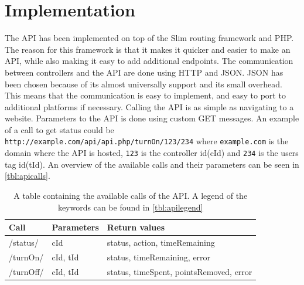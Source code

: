 \section{Implementation}
The API has been implemented on top of the Slim routing framework\citep{slimFramework} and PHP. The reason for this framework is that it makes it quicker and easier to make an API, while also making it easy to add additional endpoints. The communication between controllers and the API are done using HTTP and JSON. JSON has been chosen because of its almost universally support and its small overhead. This means that the communication is easy to implement, and easy to port to additional platforms if necessary. Calling the API is as simple as navigating to a website. Parameters to the API is done using custom GET messages. An example of a call to get status could be \\ \texttt{http://example.com/api/api.php/turnOn/123/234} where \texttt{example.com} is the domain where the API is hosted, \texttt{123} is the controller id(cId) and \texttt{234} is the users tag id(tId). An overview of the available calls and their parameters can be seen in \autoref{tbl:apicalls}.
\begin{table}[!h]
\begin{tabular}{| l | l | l |}
\hline
Call & Parameters & Return values \\
\hline
/status/ & cId & status, action, timeRemaining \\
\hline
/turnOn/ & cId, tId & status, timeRemaining, error \\
\hline
/turnOff/ & cId, tId & status, timeSpent, pointsRemoved, error \\
\hline
\end{tabular}
\caption{A table containing the available calls of the API. A legend of the keywords can be found in \autoref{tbl:apilegend}}
\label{tbl:apicalls}
\end{table}

